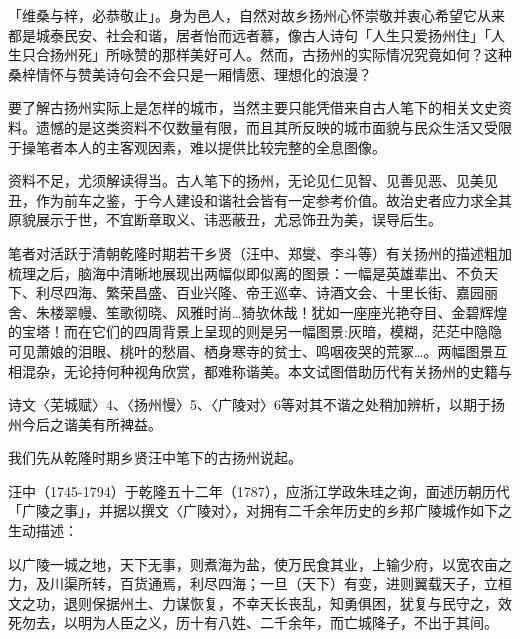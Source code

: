 「维桑与梓，必恭敬止」。身为邑人，自然对故乡扬州心怀崇敬并衷心希望它从来都是城泰民安、社会和谐，居者怡而远者慕，像古人诗句「人生只爱扬州住」「人生只合扬州死」所咏赞的那样美好可人。然而，古扬州的实际情况究竟如何？这种桑梓情怀与赞美诗句会不会只是一厢情愿、理想化的浪漫？

要了解古扬州实际上是怎样的城市，当然主要只能凭借来自古人笔下的相关文史资料。遗憾的是这类资料不仅数量有限，而且其所反映的城市面貌与民众生活又受限于操笔者本人的主客观因素，难以提供比较完整的全息图像。

资料不足，尤须解读得当。古人笔下的扬州，无论见仁见智、见善见恶、见美见丑，作为前车之鉴，于今人建设和谐社会皆有一定参考价值。故治史者应力求全其原貌展示于世，不宜断章取义、讳恶蔽丑，尤忌饰丑为美，误导后生。

笔者对活跃于清朝乾隆时期若干乡贤（汪中、郑燮、李斗等）有关扬州的描述粗加梳理之后，脑海中清晰地展现出两幅似即似离的图景：一幅是英雄辈出、不负天下、利尽四海、繁荣昌盛、百业兴隆、帝王巡幸、诗酒文会、十里长街、嘉园丽舍、朱楼翠幔、笙歌彻晓、风雅时尚…猗欤休哉！犹如一座座光艳夺目、金碧辉煌的宝塔！而在它们的四周背景上呈现的则是另一幅图景:灰暗，模糊，茫茫中隐隐可见萧娘的泪眼、桃叶的愁眉、栖身寒寺的贫士、鸣咽夜哭的荒冢…。两幅图景互相混杂，无论持何种视角欣赏，都难称谐美。本文试图借助历代有关扬州的史籍与

\vfill
\begin{BookNotes}
\end{BookNotes}

\noindent 诗文〈芜城赋〉4、〈扬州慢〉5、〈广陵对〉6等对其不谐之处稍加辨析，以期于扬州今后之谐美有所裨益。


我们先从乾隆时期乡贤汪中笔下的古扬州说起。

汪中（1745-1794）于乾隆五十二年（1787），应浙江学政朱珪之询，面述历朝历代「广陵之事」，并据以撰文〈广陵对〉，对拥有二千余年历史的乡邦广陵城作如下之生动描述：

\begin{BookQuote}
以广陵一城之地，天下无事，则煮海为盐，使万民食其业，上输少府，以宽农亩之力，及川渠所转，百货通焉，利尽四海；一旦（天下）有变，进则翼载天子，立桓文之功，退则保据州土、力谋恢复，不幸天长丧乱，知勇俱困，犹复与民守之，效死勿去，以明为人臣之义，历十有八姓、二千余年，而亡城降子，不出于其间。
\end{BookQuote}

